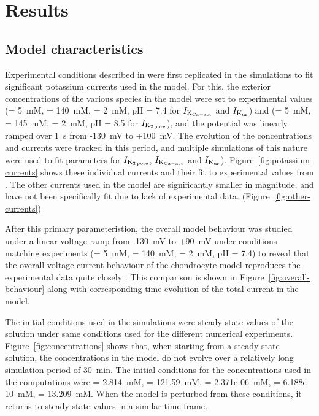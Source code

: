 \section*{Results}
\label{results}

\subsection*{Model characteristics}

Experimental conditions described in \citet{Clarketal2011} were first
replicated in the simulations to fit significant potassium currents
used in the model. For this, the exterior concentrations of the
various species in the model were set to experimental values (\Ko =
5~mM, \Nao = 140~mM, \Cao = 2~mM, pH = 7.4 for $I_{\rm K_{Ca-act}}$
and $I_{\rm K_{ur}}$) and (\Ko = 5~mM, \Nao = 145~mM, \Cao = 2~mM, pH
= 8.5 for $I_{\rm K_{2\, pore}}$), and the potential was linearly ramped
over 1~s from -130~mV to +100~mV. The evolution of the concentrations
and currents were tracked in this period, and multiple simulations
of this nature were used to fit parameters for $I_{\rm K_{2\, pore}}$,
$I_{\rm K_{Ca-act}}$ and $I_{\rm
  K_{ur}}$). Figure~\ref{fig:potassium-currents} shows these
individual currents and their fit to experimental values from
\citet{Clarketal2011}. The other currents used in the model are
significantly smaller in magnitude, and have not been specifically fit
due to lack of experimental data. (Figure~\ref{fig:other-currents})

After this primary parameteristion, the overall model behaviour was
studied under a linear voltage ramp from -130~mV to +90~mV under
conditions matching experiments (\Ko = 5~mM, \Nao = 140~mM, \Cao =
2~mM, pH = 7.4) to reveal that the overall voltage-current behaviour
of the chondrocyte model reproduces the experimental data quite
closely \citep{Clarketal2011}. This comparison is shown in
Figure~\ref{fig:overall-behaviour} along with corresponding time
evolution of the total current in the model.

The initial conditions used in the simulations were steady
state values of the solution under same conditions used for the
different numerical experiments. Figure~\ref{fig:concentrations} shows
that, when starting from a steady state solution, the concentrations
in the model do not evolve over a relatively long simulation period of
30~min. The initial conditions for the concentrations used in the
computations were \Nai = 2.814~mM, \Ki = 121.59~mM, \Cai =
2.371e-06~mM, \Hi = 6.188e-10~mM, \Cli = 13.209~mM. When the model is
perturbed from these conditions, it returns to steady state values in
a similar time frame.

